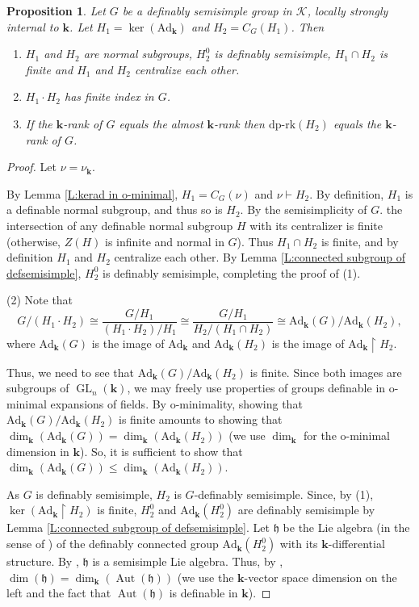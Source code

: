 \documentclass[11pt]{amsart}
\DeclareMathOperator{\gl}{GL} \DeclareMathOperator{\agl}{AGL}
\DeclareMathOperator{\aut}{Aut} \DeclareMathOperator{\id}{Id}
\newtheorem{proposition}[theorem]{Proposition}
\theoremstyle{definition}
\newcommand{\bk}{\textbf{k}}
\newcommand{\CK}{{\mathcal K}}
\newcommand{\0}{\emptyset}
\newcommand{\ad}{\mathrm{Ad}}
\def\dpr{\mathrm{dp\text{-}rk}}
\begin{document}
\begin{proposition}\label{P:general H1,H2 into o-minimal}
Let  $G$  be 
a definably semisimple group in $\CK$, locally strongly internal to $\bk$. 
Let $H_1=\ker(\ad_\bk)$ and $H_2=C_G(H_1)$. Then
\begin{enumerate}
    \item $H_1$ and $H_2$ are normal subgroups, $H_2^0$ is definably semisimple, $H_1\cap H_2$ is finite and $H_1$ and $H_2$ centralize each other. 
    \item $H_1\cdot H_2$ has finite index in $G$.
    \item If the $\bk$-rank of $G$ equals the almost $\bk$-rank then $\dpr(H_2)$ equals the $\bk$-rank of $G$.
\end{enumerate}
\end{proposition}
\begin{proof}
    Let $\nu=\nu_\bk$.
    
    By Lemma \ref{L:kerad in o-minimal}, $H_1=C_G(\nu)$ and $\nu\vdash H_2$. By definition, $H_1$ is a definable normal subgroup, and thus so is $H_2$. 
    By the semisimplicity of $G$. the intersection of any definable normal subgroup $H$ with its centralizer is finite (otherwise, $Z(H)$ is infinite and normal in $G$).
    Thus  $H_1\cap H_2$  is finite, and by definition $H_1$ and $H_2$ centralize each other. By Lemma \ref{L:connected subgroup of defsemisimple}, $H_2^0$ is definably semisimple, completing the proof of (1).

    (2)  Note that
        \[G/(H_1\cdot H_2)\cong \frac{G/H_1}{(H_1\cdot H_2)/H_1}\cong \frac{G/H_1}{H_2/(H_1\cap H_2)}\cong \ad_\bk(G)/\ad_\bk(H_2),\]
    where $\ad_\bk(G)$ is the image of $\ad_\bk$ and $\ad_\bk(H_2)$ is the image of $\ad_\bk\restriction H_2$.

    Thus, we need to see that $\ad_\bk(G)/\ad_\bk(H_2)$ is finite. Since both images are subgroups of $\gl_n(\bk)$, we may freely use properties of groups definable in o-minimal expansions of fields. By o-minimality, showing  that $\ad_\bk(G)/\ad_\bk(H_2)$ is finite  amounts to showing that $\dim_\bk(\ad_\bk(G))=\dim_\bk(\ad_\bk(H_2))$ (we use $\dim_\bk$ for the o-minimal dimension in $\bk$). So, it is sufficient  to show that $\dim_\bk(\ad_\bk(G))\leq \dim_\bk(\ad_\bk(H_2))$. 
    
    As $G$ is definably semisimple, $H_2$ is $G$-definably semisimple. Since, by (1),  $\ker(\ad_\bk\restriction H_2)$  is finite, $H_2^0$ and $\ad_\bk(H_2^0)$ are definably semisimple by Lemma \ref{L:connected subgroup of defsemisimple}. Let $\mathfrak{h}$ be the Lie algebra (in the sense of \cite{PePiSt-defsimple})  of the definably connected  group $\ad_\bk(H_2^0)$ with its $\bk$-differential structure. By \cite[Theorem 2.34]{PePiSt-defsimple}, $\mathfrak{h}$ is a semisimple Lie algebra. Thus,  by \cite[Claim 2.8]{PePiSt-defsimple},  $\dim(\mathfrak{h})=\dim_\bk(\aut(\mathfrak{h}))$ (we use  the $\bk$-vector space dimension on the left and  the fact that $\aut(\mathfrak h)$ is definable in $\bk$).


\end{proof}
\end{document}
